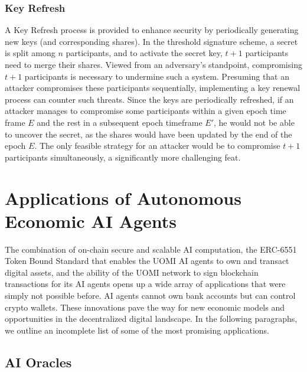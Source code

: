 \documentclass{article}
\begin{document}
\subsubsection{Key Refresh}
A Key Refresh process is provided to enhance security by periodically generating new keys (and corresponding shares). In the threshold signature scheme, a secret is split among \(n\) participants, and to activate the secret key,  \(t+1\) participants need to merge their shares. 
Viewed from an adversary's standpoint, compromising \(t+1\) participants is necessary to undermine such a system. Presuming that an attacker compromises these participants sequentially, implementing a key renewal process can counter such threats. 
Since the keys are periodically refreshed, if an attacker manages to compromise some participants within a given epoch time frame \(E\) and the rest in a subsequent epoch timeframe \(E'\), he would not be able to uncover the secret, as the shares would have been updated by the end of the epoch \(E\). The only feasible strategy for an attacker would be to compromise \(t+1\) participants simultaneously, a significantly more challenging feat.


\section{Applications of Autonomous Economic AI Agents}


The combination of on-chain secure and scalable AI computation, the ERC-6551 Token Bound Standard that enables the UOMI AI agents to own and transact digital assets, and the ability of the UOMI network to sign blockchain transactions for its AI agents opens up a wide array of applications that were simply not possible before. AI agents cannot own bank accounts but can control crypto wallets.
These innovations pave the way for new economic models and opportunities in the decentralized digital landscape. In the following paragraphs, we outline an incomplete list of some of the most promising applications. 

\subsection{AI Oracles}
\end{document}

